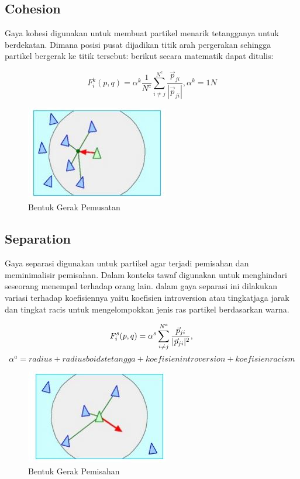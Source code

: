 \subsection{Cohesion}\label{sec:cohesion}
\hspace{0.5cm}Gaya kohesi digunakan untuk membuat partikel menarik tetangganya untuk berdekatan. Dimana posisi pusat dijadikan titik arah pergerakan sehingga partikel bergerak ke titik tersebut: berikut secara matematik dapat ditulis:

\begin{equation}
 F_i^k(p,q) = \alpha^k \dfrac{1}{N^c}\sum^{N^c}_{i \neq j}\dfrac{\vec{p}_{ji}}{|\vec{p}_{ji}|} , \alpha^k = 1N
\end{equation}
\begin{figure}
\centering
\includegraphics[scale=0.5]{gambar/cohesion}
\caption{Bentuk Gerak Pemusatan}
\end{figure}

\subsection{Separation}\label{sec:separation}
\hspace{0.5cm} Gaya separasi digunakan untuk partikel agar terjadi pemisahan dan meminimalisir pemisahan. Dalam konteks tawaf digunakan untuk menghindari seseorang menempal terhadap orang lain. dalam gaya separasi ini dilakukan variasi terhadap koefisiennya yaitu koefisien introversion atau tingkatjaga jarak dan tingkat racis untuk mengelompokkan jenis ras partikel berdasarkan warna.

\begin{equation}
 F_i^s(p,q) = \alpha^s \sum^{N^c}_{i \neq j}\dfrac{\vec{p}_{ji}}{|\vec{p}_{ji}|^2},\\
 \end{equation}
\begin{equation}
\alpha^a = radius + radius boids tetangga + koefisien introversion + koefisien racism
 \end{equation}

\begin{figure}
\centering
\includegraphics[scale=0.5]{gambar/separation}
\caption{Bentuk Gerak Pemisahan}
\end{figure}

